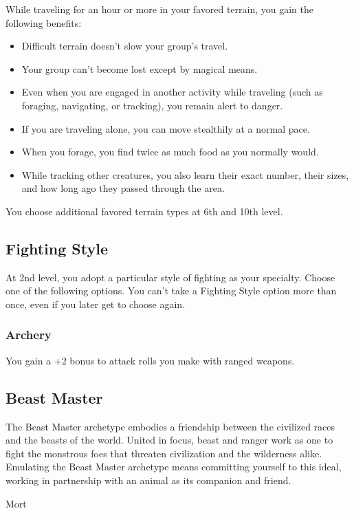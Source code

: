 {While traveling for an hour or more in your favored terrain, you gain the following benefits:
\begin{itemize}
	\item Difficult terrain doesn’t slow your group’s travel.
	\item Your group can’t become lost except by magical means.
	\item Even when you are engaged in another activity while traveling (such as foraging, navigating, or tracking), you remain alert to danger.
	\item If you are traveling alone, you can move stealthily at a normal pace.
	\item When you forage, you find twice as much food as you normally would.
	\item While tracking other creatures, you also learn their exact number, their sizes, and how long ago they passed through the area.
\end{itemize}
You choose additional favored terrain types at 6th and 10th level.
\subsection*{Fighting Style}
At 2nd level, you adopt a particular style of fighting as your specialty. Choose one of the following options. You can't take a Fighting Style option more than once, even if you later get to choose again.
\subsubsection*{Archery}
You gain a +2 bonus to attack rolls you make with ranged weapons.
\subsection*{Beast Master}
The Beast Master archetype embodies a friendship between the civilized races and the beasts of the world. United in focus, beast and ranger work as one to fight the monstrous foes that threaten civilization and the wilderness alike. Emulating the Beast Master archetype means committing yourself to this ideal, working in partnership with an animal as its companion and friend.
\begin{DndMonster}[width=0.5\textwidth]{Mort}

    \DndMonsterBasics[
        armor-class = {13 + PB (\ProficiencyValue) (Natural Armor)},
        hit-points  = {\intcalcMul{5}{\LevelValue} (\LevelValue d8)},
        speed       = {25 ft., climb 35 ft.},
    ]
    

\end{DndMonster}}

